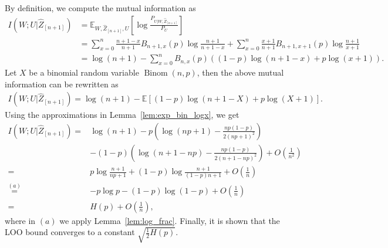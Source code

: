 \documentclass[onecolumn,romanappendices,10pt]{IEEEtran}
\newcommand{\EE}{{\mathbb{E}}}
\DeclareMathOperator{\Binomial}{Binom}
\begin{document}
	By definition, we compute the mutual information as
	\begin{equation}
		\begin{aligned}
			I\left( W; U | \hat{Z}_{[n+1]} \right) &= \EE_{W, \hat{Z}_{[n+1]}, U} \left[ \log \frac{P_{U | W, \hat{Z}_{[n+1]}}}{P_{U}} \right] \\
			&= \sum_{x=0}^{n} \frac{n+1-x}{n+1} B_{n+1,x}(p) \log \frac{n+1}{n+1-x} + \sum_{x=0}^{n} \frac{x+1}{n+1} B_{n+1,x+1}(p) \log \frac{n+1}{x+1} \\
			&= \log (n+1) - \sum_{x=0}^{n} B_{n,x}(p) \left( (1-p)\log (n+1-x) + p \log (x+1) \right).
		\end{aligned}
	\end{equation}
	Let $X$ be a binomial random variable $\Binomial(n, p)$, then the above mutual information can be rewritten as
	\begin{equation}
		\begin{aligned}
			I\left( W; U | \hat{Z}_{[n+1]} \right) = \log (n+1) - \EE \left[ (1-p)\log (n+1-X) + p \log (X+1) \right].
		\end{aligned}
		\label{eq:Ber_LOO}
	\end{equation}
	Using the approximations in Lemma~\ref{lem:exp_bin_logx}, we get
	\begin{equation}
		\begin{aligned}
			I\left( W; U | \hat{Z}_{[n+1]} \right) =& \log (n + 1) - p \left( \log (np + 1) - \frac{np (1 - p)}{2 (np + 1)^2} \right) \\
			&- (1 - p) \left( \log (n + 1 - np) - \frac{np (1 - p)}{2 (n + 1 - np)^2} \right) + O\left( \frac{1}{n^2} \right) \\
			=& p \log \frac{n + 1}{np + 1} + (1 - p) \log \frac{n + 1}{(1 - p) n + 1} + O\left( \frac{1}{n} \right)\\
			\overset{(a)}{=}& - p \log p - (1-p) \log (1 - p) + O\left( \frac{1}{n} \right) \\
			=& H(p) + O\left( \frac{1}{n} \right),
		\end{aligned}
	\end{equation}
	where in $(a)$ we apply Lemma~\ref{lem:log_frac}. Finally, it is shown that the LOO bound converges to a constant $\sqrt{\frac{1}{2} H(p)}$.
	
\end{document}
